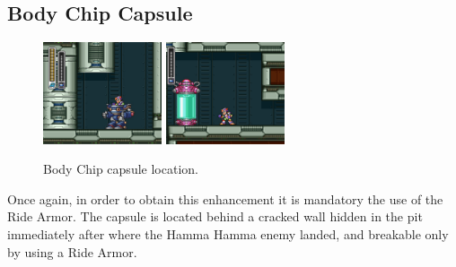 \subsection{Body Chip Capsule}
\begin{figure}[htp]
	\centering
	\includegraphics[height=3cm]{figures/X3/Crush_crawfish/Armor_1.png}
	\includegraphics[height=3cm]{figures/X3/Crush_crawfish/Armor_2.png}
	\caption{Body Chip capsule location.}
\end{figure}
Once again, in order to obtain this enhancement it is mandatory the use of the Ride Armor. The capsule is located behind a cracked wall hidden in the pit immediately after where the Hamma Hamma enemy landed, and breakable only by using a Ride Armor.


